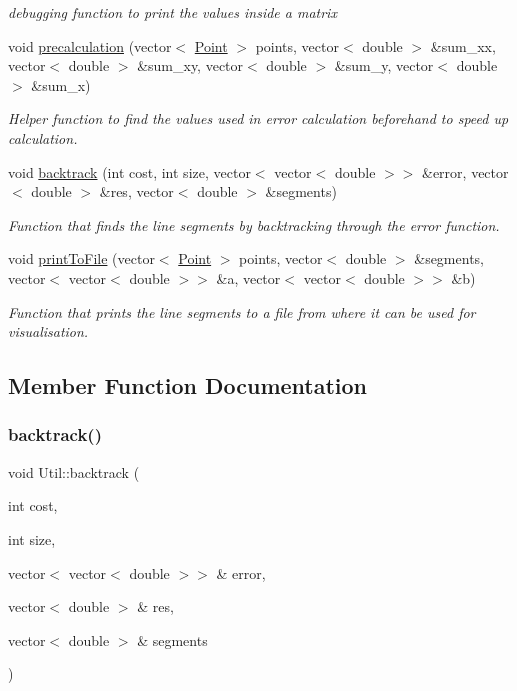 \begin{DoxyCompactItemize}
\begin{DoxyCompactList}\small\item\em debugging function to print the values inside a matrix \end{DoxyCompactList}\item 
void \hyperlink{classUtil_a5ae97aa4dd9d925c898463e6a6b299aa}{precalculation} (vector$<$ \hyperlink{classPoint}{Point} $>$ points, vector$<$ double $>$ \&sum\+\_\+xx, vector$<$ double $>$ \&sum\+\_\+xy, vector$<$ double $>$ \&sum\+\_\+y, vector$<$ double $>$ \&sum\+\_\+x)
\begin{DoxyCompactList}\small\item\em Helper function to find the values used in error calculation beforehand to speed up calculation. \end{DoxyCompactList}\item 
void \hyperlink{classUtil_a1a617982a036cdf75a0751a900be4963}{backtrack} (int cost, int size, vector$<$ vector$<$ double $>$$>$ \&error, vector$<$ double $>$ \&res, vector$<$ double $>$ \&segments)
\begin{DoxyCompactList}\small\item\em Function that finds the line segments by backtracking through the error function. \end{DoxyCompactList}\item 
void \hyperlink{classUtil_a301898b592f7bd987cb56a57cbbe2e92}{print\+To\+File} (vector$<$ \hyperlink{classPoint}{Point} $>$ points, vector$<$ double $>$ \&segments, vector$<$ vector$<$ double $>$$>$ \&a, vector$<$ vector$<$ double $>$$>$ \&b)
\begin{DoxyCompactList}\small\item\em Function that prints the line segments to a file from where it can be used for visualisation. \end{DoxyCompactList}\end{DoxyCompactItemize}


\subsection{Member Function Documentation}
\mbox{\label{classUtil_a1a617982a036cdf75a0751a900be4963}} 
\subsubsection{\texorpdfstring{backtrack()}{backtrack()}}
{\footnotesize\ttfamily void Util\+::backtrack (\begin{DoxyParamCaption}\item[{int}]{cost,  }\item[{int}]{size,  }\item[{vector$<$ vector$<$ double $>$$>$ \&}]{error,  }\item[{vector$<$ double $>$ \&}]{res,  }\item[{vector$<$ double $>$ \&}]{segments }\end{DoxyParamCaption})}



